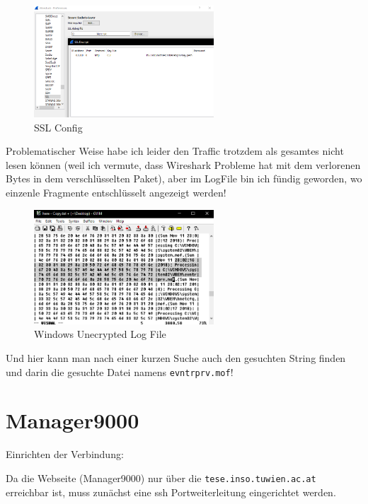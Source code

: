 \documentclass[12pt,a4paper,titlepage,oneside]{scrartcl}
\begin{document}
\begin{figure}[h!]
  \centering
    \includegraphics[width=0.6\textwidth]{./imgs/intranet_screenshots/sslConfig.png}
  \caption{SSL Config}
  \label{fig:sslConfig}
\end{figure}

Problematischer Weise habe ich leider den Traffic trotzdem als gesamtes nicht lesen können (weil ich vermute, dass Wireshark Probleme hat mit dem verlorenen Bytes in dem verschlüsselten Paket), aber im LogFile bin ich fündig geworden, wo einzenle Fragmente entschlüsselt angezeigt werden!

\begin{figure}[h!]
  \centering
    \includegraphics[width=0.6\textwidth]{./imgs/intranet_screenshots/windowsLogFile.png}
  \caption{Windows Unecrypted Log File}
  \label{fig:winLog}
\end{figure}

Und hier kann man nach einer kurzen Suche auch den gesuchten String finden und darin die gesuchte Datei namens \lstinline{evntrprv.mof}!

\section{Manager9000}

Einrichten der Verbindung:

Da die Webseite (Manager9000) nur über die \lstinline{tese.inso.tuwien.ac.at} erreichbar ist, muss zunächst eine ssh Portweiterleitung eingerichtet werden.
\end{document}
